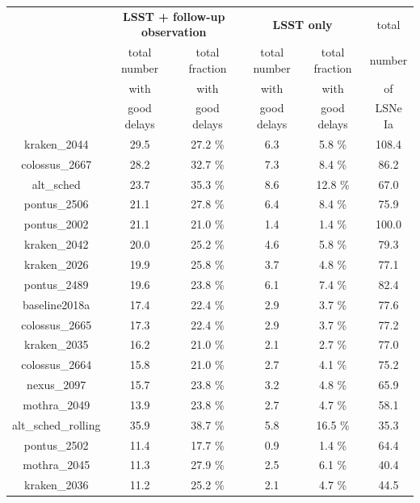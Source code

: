 \begin{table}
\centering
\begin{tabular}{c|c|c|c|c|c}
\multicolumn{1}{c}{}& \multicolumn{2}{c}{\textbf{LSST + follow-up observation}}  & \multicolumn{2}{c}{\textbf{LSST only}} & \multicolumn{1}{c}{total } \\

& total number  & total fraction  & total number  & total fraction  & number \\
&  with & with & with& with & of\\
& good delays & good delays& good delays& good delays&LSNe Ia\\
\hline
kraken\_2044 & 29.5 & 27.2 \% & 6.3 & 5.8 \% & 108.4 \\
\hline
colossus\_2667 & 28.2 & 32.7 \% & 7.3 & 8.4 \% & 86.2 \\
\hline
alt\_sched & 23.7 & 35.3 \% & 8.6 & 12.8 \% & 67.0 \\
\hline
pontus\_2506 & 21.1 & 27.8 \% & 6.4 & 8.4 \% & 75.9 \\
\hline
pontus\_2002 & 21.1 & 21.0 \% & 1.4 & 1.4 \% & 100.0\\
\hline
kraken\_2042 & 20.0 &  25.2 \% & 4.6 & 5.8 \% & 79.3 \\
\hline
kraken\_2026 & 19.9 &  25.8 \% & 3.7 & 4.8 \% & 77.1 \\
\hline
pontus\_2489 & 19.6 &  23.8 \% & 6.1 & 7.4 \% & 82.4 \\
\hline
baseline2018a & 17.4 &  22.4 \% & 2.9 & 3.7 \% & 77.6  \\
\hline
colossus\_2665 & 17.3 & 22.4 \% & 2.9 & 3.7 \% & 77.2  \\
\hline
kraken\_2035 & 16.2 &  21.0 \% & 2.1 & 2.7 \% & 77.0 \\
\hline
colossus\_2664 & 15.8 & 21.0 \% & 2.7 & 4.1 \% & 75.2  \\
\hline
nexus\_2097 & 15.7&  23.8 \% & 3.2 & 4.8 \% & 65.9 \\
\hline
mothra\_2049 & 13.9&  23.8 \% & 2.7 & 4.7 \% & 58.1\\
\hline
alt\_sched\_rolling & 35.9 &  38.7 \% & 5.8 & 16.5 \% & 35.3 \\
\hline
pontus\_2502 & 11.4 &  17.7 \% & 0.9 & 1.4 \% & 64.4 \\
\hline
mothra\_2045 & 11.3& 27.9 \% & 2.5 & 6.1 \% & 40.4\\
\hline
kraken\_2036 & 11.2 &  25.2 \% & 2.1 & 4.7 \% & 44.5 \\



\end{tabular}
\end{table}
